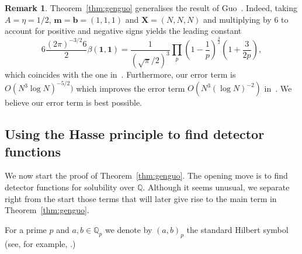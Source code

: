 \documentclass[a4paper,12pt,reqno]{amsart}
\numberwithin{equation}{section} \numberwithin{figure}{section}
\newcommand\Q{\mathbb{Q}}
\renewcommand{\l}{\left}
\renewcommand{\r}{\right}
\renewcommand{\b}{\mathbf}
\renewcommand{\#}{\sharp}
\theoremstyle{definition}
\newtheorem{remark}[lemma]{Remark}
\numberwithin{lemma}{section}
\begin{document}
\begin{remark} 
\label{rem:erterm}
 Theorem~\ref{thm:genguo} generalises the result of Guo~\cite[Theorem 1.1]{Guo95}.
Indeed, taking $A=\eta=1/2$, $\b m =\b b = (1,1,1)$ and $ \b X=(N,N,N)$ 
and multiplying by $6$ to   account for positive and negative signs
yields the leading constant 
\[
6 \frac{    (2\pi )^{-3/2}  6  }{  2   } \beta(\b 1 , \b 1 )
= 
   \frac{  1 }{ (\sqrt \pi /2)^3   } 
  \prod_{  p   } 
 \l(1-\frac{1}{p} \r)^{\frac{3}{2} }
\l(1+  \frac{3}{2 p} \r) 
 ,\] which coincides with the one in~\cite[Theorem 1.1]{Guo95}. Furthermore, 
our error  term     is $O(N^3\log N)^{-5/2})$ which improves the error term 
$O(N^3 (\log N)^{-2})$ in~\cite[Theorem 1.1]{Guo95}. We believe our error term
is best possible.
 \end{remark}
 
\subsection{Using the Hasse principle to find detector functions}
\label{s:transformdetector}
We now start   the proof of Theorem~\ref{thm:genguo}.
The opening  move is to find 
 detector functions for solubility over $\mathbb Q$. 
Although it   seems     unusual,    we separate right from the start 
 those    terms that will later give rise to the main term in Theorem~\ref{thm:genguo}.

 


 For a  prime $p$ and $a,b \in \Q_p$  we denote by 
$(a,b)_p$ the standard Hilbert symbol (see, for example, \cite[Chapter III]{Ser73}.)
\end{document}
